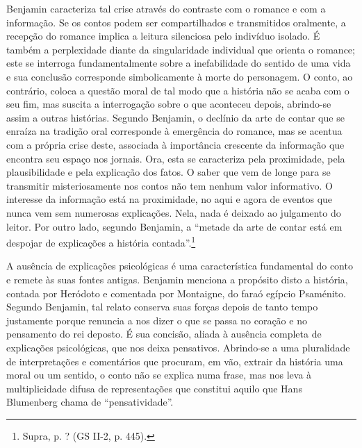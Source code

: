 Benjamin caracteriza tal crise através do contraste com o romance e com
a informação. Se os contos podem ser compartilhados e transmitidos
oralmente, a recepção do romance implica a leitura silenciosa pelo
indivíduo isolado. É também a perplexidade diante da singularidade
individual que orienta o romance; este se interroga fundamentalmente
sobre a inefabilidade do sentido de uma vida e sua conclusão corresponde
simbolicamente à morte do personagem. O conto, ao contrário, coloca a
questão moral de tal modo que a história não se acaba com o seu fim, mas
suscita a interrogação sobre o que aconteceu depois, abrindo-se assim a
outras histórias. Segundo Benjamin, o declínio da arte de contar que se
enraíza na tradição oral corresponde à emergência do romance, mas se
acentua com a própria crise deste, associada à importância crescente da
informação que encontra seu espaço nos jornais. Ora, esta se caracteriza
pela proximidade, pela plausibilidade e pela explicação dos fatos. O
saber que vem de longe para se transmitir misteriosamente nos contos não
tem nenhum valor informativo. O interesse da informação está na
proximidade, no aqui e agora de eventos que nunca vem sem numerosas
explicações. Nela, nada é deixado ao julgamento do leitor. Por outro
lado, segundo Benjamin, a ``metade da arte de contar está em despojar de
explicações a história contada''.\footnote{Supra, p. ? (GS II-2, p.
  445).}

A ausência de explicações psicológicas é uma característica fundamental
do conto e remete às suas fontes antigas. Benjamin menciona a propósito
disto a história, contada por Heródoto e comentada por Montaigne, do
faraó egípcio Psaménito. Segundo Benjamin, tal relato conserva suas
forças depois de tanto tempo justamente porque renuncia a nos dizer o
que se passa no coração e no pensamento do rei deposto. É sua concisão,
aliada à ausência completa de explicações psicológicas, que nos deixa
pensativos. Abrindo-se a uma pluralidade de interpretações e comentários
que procuram, em vão, extrair da história uma moral ou um sentido, o
conto não se explica numa frase, mas nos leva à multiplicidade difusa de
representações que constitui aquilo que Hans Blumenberg chama de
``pensatividade''.

